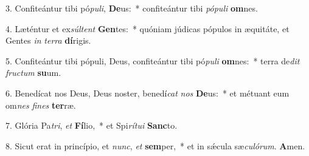 3. Confiteántur tibi pó\textit{pu}\textit{li}, \textbf{De}us:~* confiteántur tibi \textit{pó}\textit{pu}\textit{li} \textbf{om}nes.

4. Læténtur et ex\textit{súl}\textit{tent} \textbf{Gen}tes:~* quóniam júdicas pópulos in æquitáte, et Gentes \textit{in} \textit{ter}\textit{ra} \textbf{dí}rigis.

5. Confiteántur tibi pópuli, Deus, confiteántur tibi pó\textit{pu}\textit{li} \textbf{om}nes:~* terra de\textit{dit} \textit{fruc}\textit{tum} \textbf{su}um.

6. Benedícat nos Deus, Deus noster, benedí\textit{cat} \textit{nos} \textbf{De}us:~* et métuant eum om\textit{nes} \textit{fi}\textit{nes} \textbf{ter}ræ.

7. Glória Pa\textit{tri}, \textit{et} \textbf{Fí}lio,~* et Spi\textit{rí}\textit{tu}\textit{i} \textbf{Sanc}to.

8. Sicut erat in princípio, et \textit{nunc}, \textit{et} \textbf{sem}per,~* et in s\'{\ae}cula sæ\textit{cu}\textit{ló}\textit{rum}. \textbf{A}men.